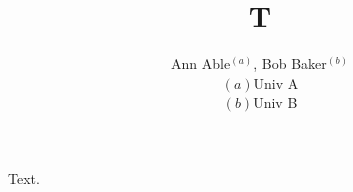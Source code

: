 \documentclass{article}
\begin{document}
\title{T}
\author{Ann Able$^{(a)}$, Bob Baker$^{(b)}$\\ $(a)$Univ A\\ $(b)$Univ B}
\maketitle
Text.
\end{document}
